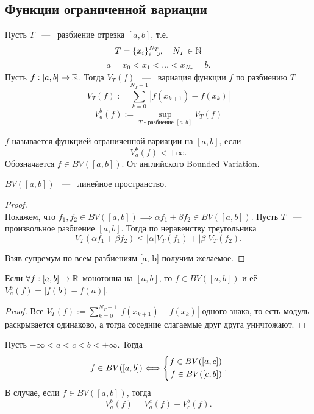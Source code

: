 \subsection{Функции ограниченной вариации}
\begin{definition}
	Пусть $T$ ~---~ разбиение отрезка $[a, b]$, т.е. \[
		T = \{x_i\}_{i=0}^{N_T}, \quad N_T \in \mathbb{N}
	\]\[
		a = x_0 < x_1 < \dots < x_{N_T} = b.
	\]
	Пусть $f: [a, b] \rightarrow \mathbb{R}$. Тогда $V_T(f)$ ~---~ вариация функции $f$ по разбиению $T$\[
		V_T(f) := \sum_{k=0}^{N_T-1} |f(x_{k+1}) - f(x_k)|
	\]
	\[
		V_a^b(f) := \sup_{T\text{ - разбиение } [a, b]} V_T(f)
	\]
\end{definition}
\begin{definition}
	$f$ называется функцией ограниченной вариации на $[a, b]$, если\[
	V_a^b (f) < +\infty.
	\]
	Обозначается $f\in BV([a, b])$. От английского Bounded Variation.
\end{definition}
\begin{theorem}
	$BV([a,b])$ ~---~ линейное пространство.
\end{theorem}
\begin{proof} \ \\
	Покажем, что $f_1, f_2 \in BV([a, b]) \implies \alpha f_1 + \beta f_2 \in BV([a, b])$. Пусть $T$ ~---~ произвольное разбиение $[a, b]$. Тогда по неравенству треугольника \[
		V_T(\alpha f_1 + \beta f_2)
		\leq
		|\alpha| V_T(f_1) + |\beta| V_T(f_2).
	\]
	
	Взяв супремум по всем разбиениям [a, b] получим желаемое.
\end{proof}
\begin{lemma}
	Если $\forall f: [a, b] \rightarrow \mathbb{R}$ монотонна на $[a, b]$, то $f \in BV([a, b])$ и её $V_a^b (f) = |f(b) - f(a)|$.
\end{lemma}
\begin{proof}
	Все $V_T(f) := \sum_{k=0}^{N_T-1} |f(x_{k+1}) - f(x_k)|$ одного знака, то есть модуль раскрывается одинаково, а тогда соседние слагаемые друг друга уничтожают.
\end{proof}
\begin{lemma}
	Пусть $-\infty < a < c < b < +\infty$. Тогда
	\[
	f \in BV([a, b]) \Longleftrightarrow \left\{\begin{aligned}f \in BV([a, c]) \\ f \in BV([c, b])\end{aligned}\right..
	\]
	В случае, если $f \in BV([a, b])$, тогда \[
		V_a^b (f) = V_a^c (f) + V_c^b (f).
	\]
\end{lemma}
